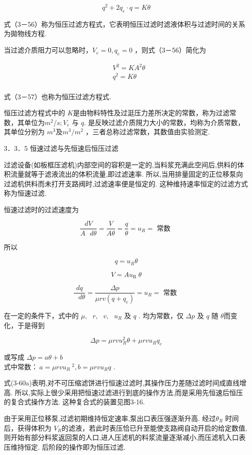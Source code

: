 \documentclass[
]{article}
\begin{document}
\[q^{2} + 2q_{e} \cdot q = K\theta\]

式（3－56）称为恒压过滤方程式，它表明恒压过滤时滤液体积与过滤时间的关系为拋物线方程. 

当过滤介质阻力可以忽略时，\(V_{e} = 0,q_{e} = 0\) ，则式（3－56）简化为

\[\begin{matrix}
 & V^{2} = KA^{2}\theta \\
 & q^{2} = K\theta \\
\end{matrix}\]

式（3－57）也称为恒压过滤方程式. 

恒压过滤方程式中的 \(K\)是由物料特性及过涏压力差所决定的常数，称为过滤常数，其单位为\(m^{2}/s;V_{e}\) 与 \(q\). 是反映过滤介质䧋力大小的常数，均称为介质常数，其单位分别为 \(m^{3}\)及\(m^{3}/m^{2}\) ，三者总称过滤常数，其数值由实验测定. 

3．3．5 恒速过滤与先恒速后恒压过滤

过滤设备(如板框压滤机)内部空间的容积是一定的,当料浆充满此空间后,供料的体积流量就等于滤液流出的体积流量,即过滤速率. 所以,当用排量固定的正位移泵向过滤机供料而未打开支路阀时,过滤速率便是恒定的. 这种维持速率恒定的过滤方式称为恒速过滤. 

恒速过滤时的过滤速度为

\[\frac{dV}{A\text{\ }d\theta} = \frac{V}{A\theta} = \frac{q}{\theta} = u_{R} = \text{~常数~}\]

所以

\[q = u_{R}\theta\]

\[V = Au_{\text{R}\text{~}}\theta
\]

\[\frac{dq}{\text{\ }d\theta} = \frac{\Delta p}{\mu rv\left( q + q_{e} \right)} = u_{R} = \text{~常数~}\]

在一定的条件下，式中的 \(\mu,\text{\ }r,\text{\ }v,\text{\ }u_{R}\) 及
\(q\) . 均为常数，仅 \(\Delta p\) 及 \(q\) 随 \(\theta\)而变化，于是得到

\[\Delta p = \mu rvu_{R}^{2}\theta + \mu rvu_{R}q_{e}\]

或写成 \(\Delta p = a\theta + b\)\\
式中常数：\(\ a = \mu rvu_{R}\ ^{2},b = \mu rvu_{R}q\) . 

式(3-60a)表明,对不可压缩滤饼进行恒速过滤时,其操作压力差随过滤时间成直线增高. 所以,实际上很少采用把恒速过滤进行到底的操作方法,而是采用先恒速后恒压的复合式操作方法. 这种复合式的装置见图3-16. 

由于采用正位移泵,过滤初期维持恒定速率,泵出口表压强逐渐升高. 经过\(\theta_{R}\) 时间后，获得体积为 \(V_{R}\)的滤液，若此时表压恰已升至能使支路阀自动开启的给定数值,则开始有部分料浆返回泵的人口,进人压滤机的料浆流量逐渐减小,而压滤机入口表压维持恒定. 后阶段的操作即为恒压过滤. 
\end{document}
